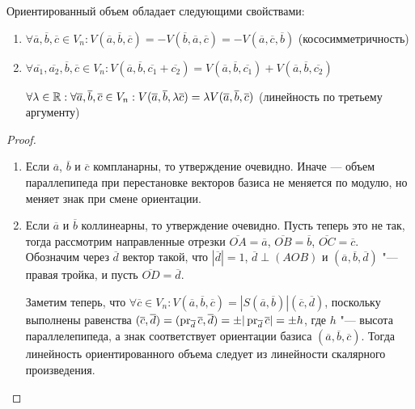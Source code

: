     \begin{theorem}
    	Ориентированный объем обладает следующими свойствами:
    	\begin{enumerate}
    		\item $\forall \overline{a}, \overline{b}, \overline{c} \in V_n: V(\overline{a}, \overline{b}, \overline{c}) = -V(\overline{b}, \overline{a}, \overline{c}) = -V(\overline{a}, \overline{c}, \overline{b})$ (кососимметричность)
    		\item $\forall \overline{a_1}, \overline{a_2}, \overline{b}, \overline{c} \in V_n: V(\overline{a}, \overline{b}, \overline{c_1} + \overline{c_2}) = V(\overline{a}, \overline{b}, \overline{c_1}) + V(\overline{a}, \overline{b}, \overline{c_2})$
    		
    		$\forall \lambda \in \R: \forall \overline a, \overline b, \overline c \nolinebreak\in\nolinebreak V_n \nolinebreak: \nolinebreak V(\overline{a}, \overline{b}, \lambda\overline{c}) \hm= \lambda V(\overline{a}, \overline{b}, \overline{c})$ (линейность по третьему аргументу)
    	\end{enumerate}
    \end{theorem}
    
    \begin{proof}~
    	\begin{enumerate}
    		\item Если $\overline{a}$, $\overline{b}$ и $\overline{c}$ компланарны, то утверждение очевидно. Иначе --- объем параллепипеда при перестановке векторов базиса не меняется по модулю, но меняет знак при смене ориентации.
    		\item Если $\overline{a}$ и $\overline{b}$ коллинеарны, то утверждение очевидно. Пусть теперь это не так, тогда рассмотрим направленные отрезки $\overline{OA} = \overline{a}$, $\overline{OB} = \overline{b}$, $\overline{OC} = \overline{c}$. Обозначим через $\overline d$ вектор такой, что $|\overline{d}| = 1$, $\overline{d} \perp (AOB)$ и $(\overline{a}, \overline{b}, \overline{d})$ "--- правая тройка, и пусть $\overline{OD} = \overline{d}$.
    		
    		Заметим теперь, что $\forall \overline{c} \in V_n: V(\overline{a}, \overline{b}, \overline{c}) = |S(\overline{a}, \overline{b})|(\overline{c}, \overline{d})$, поскольку выполнены равенства $(\overline{c}, \overline{d}) = (\pr_{\overline{d}}\overline{c}, \overline{d}) \hm{=} \pm |\pr_{\overline{d}}\overline{c}| = \pm h$, где $h$ "--- высота параллелепипеда, а знак соответствует ориентации базиса $(\overline{a}, \overline{b}, \overline{c})$. Тогда линейность ориентированного объема следует из линейности скалярного произведения.\qedhere
    	\end{enumerate}
    \end{proof}
    
